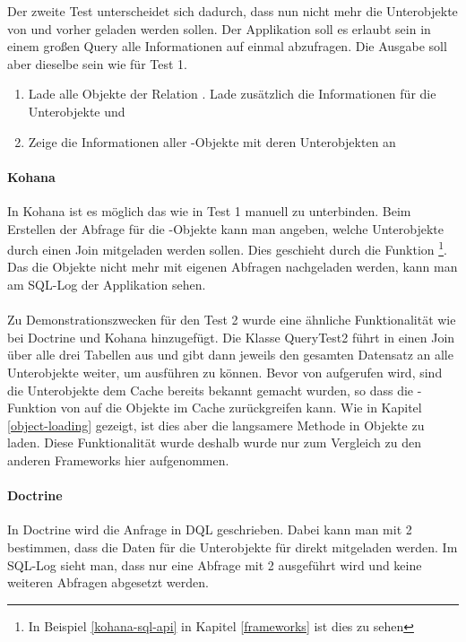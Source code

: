 Der zweite Test unterscheidet sich dadurch, dass nun nicht mehr die Unterobjekte von  und  vorher geladen werden sollen. Der Applikation soll es erlaubt sein in einem großen Query alle Informationen auf einmal abzufragen. Die Ausgabe soll aber dieselbe sein wie für Test 1.
\begin{enumerate}
\item Lade alle Objekte der Relation . Lade zusätzlich die Informationen für die Unterobjekte  und 
\item Zeige die Informationen aller -Objekte mit deren Unterobjekten an
\end{enumerate}
\paragraph{Kohana}
In Kohana ist es möglich das  wie in Test 1 manuell zu unterbinden. Beim Erstellen der Abfrage für die -Objekte kann man angeben, welche Unterobjekte durch einen Join mitgeladen werden sollen. Dies geschieht durch die Funktion \footnote{In Beispiel \ref{kohana-sql-api} in Kapitel \ref{frameworks} ist dies zu sehen}. Das die Objekte nicht mehr mit eigenen Abfragen nachgeladen werden, kann man am SQL-Log der Applikation sehen.
\paragraph{\PSCORM}
Zu Demonstrationszwecken für den Test 2 wurde eine ähnliche Funktionalität wie bei Doctrine und Kohana hinzugefügt. Die Klasse QueryTest2 führt in  einen Join über alle drei Tabellen aus und gibt dann jeweils den gesamten Datensatz an alle Unterobjekte weiter, um  aus\-füh\-ren zu können. Bevor  von  aufgerufen wird, sind die Unterobjekte dem Cache bereits bekannt gemacht wurden, so dass die -Funktion von  auf die Objekte im Cache zurückgreifen kann. Wie in Kapitel \ref{object-loading} gezeigt, ist dies aber die langsamere Methode in \PSCORM Objekte zu laden. Diese Funktionalität wurde deshalb wurde nur zum Vergleich zu den anderen Frameworks hier aufgenommen.
\paragraph{Doctrine}
In Doctrine wird die Anfrage in DQL geschrieben. Dabei kann man mit 2  bestimmen, dass die Daten für die Unterobjekte für  direkt mitgeladen werden. Im SQL-Log sieht man, dass nur eine Abfrage mit 2  ausgeführt wird und keine weiteren Abfragen abgesetzt werden.

